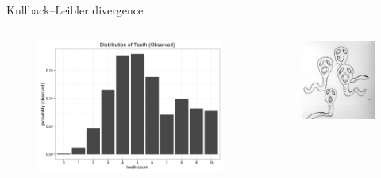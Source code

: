 \begin{frame}[fragile]{Kullback–Leibler divergence}
		\begin{columns}[onlytextwidth]
		\begin{figure}
			\includegraphics[height=0.8\textheight]{f1.png}
		\end{figure}
		\begin{figure}
			\includegraphics[height=0.5\textheight]{f2.png}
		\end{figure}

		
	\end{columns}
	
\end{frame}

